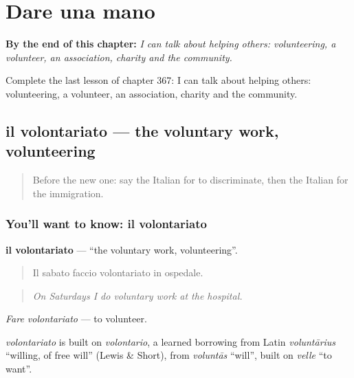 
\chapter{Dare una mano}
\label{ch:it-dare-una-mano}

\begin{chapteropening}
\textbf{By the end of this chapter:} \emph{I can talk about helping others: volunteering, a volunteer, an association, charity and the community.}

Complete the last lesson of chapter 367: I can talk about helping others: volunteering, a volunteer, an association, charity and the community.
\end{chapteropening}

\section[il volontariato]{il volontariato — the voluntary work, volunteering}

\label{lesson:IT-C367-volontariato}



\begin{quote}
Before the new one: say the Italian for to discriminate, then the Italian for the immigration.
\end{quote}

\subsection*{You'll want to know: il volontariato}
\textbf{il volontariato} — \textquotedblleft{}the voluntary work, volunteering\textquotedblright{}.

\begin{quote}
Il sabato faccio volontariato in ospedale.
\end{quote}

\begin{quote}
\emph{On Saturdays I do voluntary work at the hospital.}
\end{quote}

\emph{Fare volontariato} — to volunteer.

\begin{cousinweb}
\emph{volontariato} is built on \emph{volontario}, a learned borrowing from Latin \emph{voluntārius} \textquotedblleft{}willing, of free will\textquotedblright{} (Lewis \& Short), from \emph{voluntās} \textquotedblleft{}will\textquotedblright{}, built on \emph{velle} \textquotedblleft{}to want\textquotedblright{}.
\end{cousinweb}


